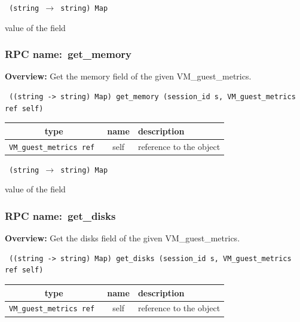 {\tt 
(string $\rightarrow$ string) Map
}


value of the field
\vspace{0.3cm}
\vspace{0.3cm}
\vspace{0.3cm}
\subsubsection{RPC name:~get\_memory}

{\bf Overview:} 
Get the memory field of the given VM\_guest\_metrics.

\begin{verbatim} ((string -> string) Map) get_memory (session_id s, VM_guest_metrics ref self)\end{verbatim}



 
\vspace{0.3cm}
\begin{tabular}{|c|c|p{7cm}|}
 \hline
{\bf type} & {\bf name} & {\bf description} \\ \hline
{\tt VM\_guest\_metrics ref } & self & reference to the object \\ \hline 

\end{tabular}

\vspace{0.3cm}

{\tt 
(string $\rightarrow$ string) Map
}


value of the field
\vspace{0.3cm}
\vspace{0.3cm}
\vspace{0.3cm}
\subsubsection{RPC name:~get\_disks}

{\bf Overview:} 
Get the disks field of the given VM\_guest\_metrics.

\begin{verbatim} ((string -> string) Map) get_disks (session_id s, VM_guest_metrics ref self)\end{verbatim}



 
\vspace{0.3cm}
\begin{tabular}{|c|c|p{7cm}|}
 \hline
{\bf type} & {\bf name} & {\bf description} \\ \hline
{\tt VM\_guest\_metrics ref } & self & reference to the object \\ \hline 

\end{tabular}

